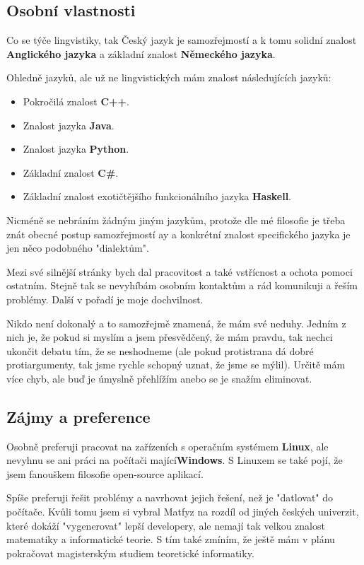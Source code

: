 \documentclass[12pt,a4paper]{article}
\begin{document}
\subsection*{Osobní vlastnosti}

Co se týče lingvistiky, tak Český jazyk je samozřejmostí a k tomu solidní znalost \textbf{Anglického jazyka }a základní znalost \textbf{Německého jazyka}.

Ohledně jazyků, ale už ne lingvistických mám znalost následujících jazyků:

\begin{itemize}
	\item Pokročilá znalost \textbf{C++}.
	\item Znalost jazyka \textbf{Java}.
	\item Znalost jazyka \textbf{Python}.
	\item Základní znalost \textbf{C\#}.
	\item Základní znalost exotičtějšího funkcionálního jazyka \textbf{Haskell}.
\end{itemize}

Nicméně se nebráním žádným jiným jazykům, protože dle mé filosofie je třeba znát obecné postup samozřejmostí ay a konkrétní znalost specifického jazyka je jen něco podobného "dialektům".

Mezi své silnější stránky bych dal pracovitost a také vstřícnost a ochota pomoci ostatním. Stejně tak se nevyhíbám osobním kontaktům a rád komunikuji a řeším problémy. Další v pořadí je moje dochvilnost.

Nikdo není dokonalý a to samozřejmě znamená, že mám své neduhy. Jedním z nich je, že pokud si myslím a jsem přesvědčený, že mám pravdu, tak nechci ukončit debatu tím, že se neshodneme (ale pokud protistrana dá dobré protiargumenty, tak jsme rychle schopný uznat, že jsme se mýlil). Určitě mám více chyb, ale buď je úmyslně přehlížím anebo se je snažím eliminovat.

\subsection*{Zájmy a preference}

Osobně preferuji pracovat na zařízeních s operačním systémem \textbf{Linux}, ale nevyhnu se ani práci na počítači mající\textbf{Windows}. S Linuxem se také pojí, že jsem fanouškem filosofie open-source aplikací.

Spíše preferuji řešit problémy a navrhovat jejich řešení, než je "datlovat" do počítače. Kvůli tomu jsem si vybral Matfyz na rozdíl od jiných českých univerzit, které dokáží "vygenerovat" lepší developery, ale nemají tak velkou znalost matematiky a informatické teorie. S tím také zmíním, že ještě mám v plánu pokračovat magisterským studiem teoretické informatiky.
\end{document}
